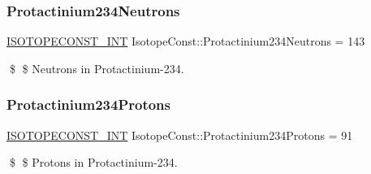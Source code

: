 \subsubsection{\texorpdfstring{Protactinium234\+Neutrons}{Protactinium234Neutrons}}
{\footnotesize\ttfamily \mbox{\hyperlink{group___isotope_const-_macros_ga5f18360b3e99483a35c32d789e62621c}{I\+S\+O\+T\+O\+P\+E\+C\+O\+N\+S\+T\+\_\+\+I\+NT}} Isotope\+Const\+::\+Protactinium234\+Neutrons = 143}

\$ \$ Neutrons in Protactinium-\/234. \mbox{\label{group___isotope_const-_protactinium-_pa234_gadee9cce1a3227bc69530384da240931d}} 
\subsubsection{\texorpdfstring{Protactinium234\+Protons}{Protactinium234Protons}}
{\footnotesize\ttfamily \mbox{\hyperlink{group___isotope_const-_macros_ga5f18360b3e99483a35c32d789e62621c}{I\+S\+O\+T\+O\+P\+E\+C\+O\+N\+S\+T\+\_\+\+I\+NT}} Isotope\+Const\+::\+Protactinium234\+Protons = 91}

\$ \$ Protons in Protactinium-\/234. 